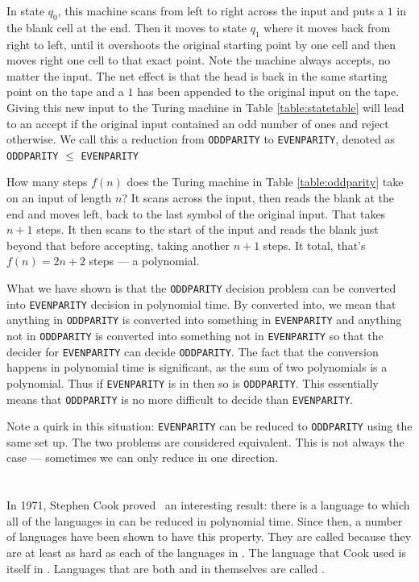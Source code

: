 \documentclass{iansnotes}
\begin{document}
  In state \(q_0\), this machine scans from left to right across the input and puts a \(1\) in the blank cell at the end.
  Then it moves to state \(q_1\) where it moves back from right to left, until it overshoots the original starting point by one cell and then moves right one cell to that exact point.
  Note the machine always accepts, no matter the input.
  The net effect is that the head is back in the same starting point on the tape and a \(1\) has been appended to the original input on the tape.
  Giving this new input to the Turing machine in Table \ref{table:statetable} will lead to an accept if the original input contained an odd number of ones and reject otherwise.
  We call this a reduction from \texttt{ODDPARITY} to \texttt{EVENPARITY}, denoted as \texttt{ODDPARITY} \( \leq \) \texttt{EVENPARITY}

  How many steps \( f(n) \) does the Turing machine in Table \ref{table:oddparity} take on an input of length \( n \)?
  It scans across the input, then reads the blank at the end and moves left, back to the last symbol of the original input.
  That takes \( n + 1 \) steps.
  It then scans to the start of the input and reads the blank just beyond that before accepting, taking another \( n + 1 \) steps.
  It total, that's \( f(n) = 2n+2 \) steps --- a polynomial.

  What we have shown is that the \texttt{ODDPARITY} decision problem can be converted into \texttt{EVENPARITY} decision in polynomial time.
  By converted into, we mean that anything in \texttt{ODDPARITY} is converted into something in \texttt{EVENPARITY} and anything not in \texttt{ODDPARITY} is converted into something not in \texttt{EVENPARITY} so that the decider for \texttt{EVENPARITY} can decide \texttt{ODDPARITY}.
  The fact that the conversion happens in polynomial time is significant, as the sum of two polynomials is a polynomial.
  Thus if \texttt{EVENPARITY} is in  then so is \texttt{ODDPARITY}.
  This essentially means that \texttt{ODDPARITY} is no more difficult to decide than \texttt{EVENPARITY}.

  Note a quirk in this situation: \texttt{EVENPARITY} can be reduced to \texttt{ODDPARITY} using the same set up.
  The two problems are considered equivalent.
  This is not always the case --- sometimes we can only reduce in one direction.

\section{}
  In 1971, Stephen Cook proved~\autocite{cook71} an interesting result: there is a language to which all of the languages in  can be reduced in polynomial time.
  Since then, a number of languages have been shown to have this property.
  They are called  because they are at least as hard as each of the languages in .
  The language that Cook used is itself in .
  Languages that are both  and in  themselves are called .
\end{document}
